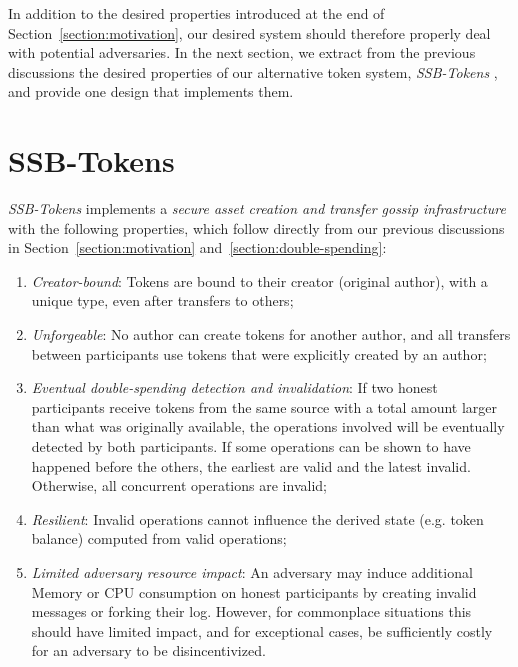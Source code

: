 \documentclass[sigplan,screen,10pt]{acmart}
\newcommand\ssbtokens[0]{\textit{SSB-Tokens} }
\begin{document}
In addition to the desired properties introduced at the end of Section~\ref{section:motivation}, our desired system should therefore properly deal with potential adversaries. In the next section, we extract from the previous discussions the desired properties of our alternative token system, \ssbtokens, and provide one design that implements them.

\section{SSB-Tokens}
\label{section:design}

\ssbtokens implements a \textit{secure asset creation and transfer gossip infrastructure} with the following properties, which follow directly from our previous discussions in Section~\ref{section:motivation} and~\ref{section:double-spending}:
\begin{enumerate}[label*=P.\arabic*]
	\item \textit{Creator-bound}: Tokens are bound to their creator (original author), with a unique type, even after transfers to others;\label{prop:author-bound}
	\item \textit{Unforgeable}: No author can create tokens for another author, and all transfers between participants use tokens that were explicitly created by an author; \label{prop:unforgeable}
	\item \textit{Eventual double-spending detection and invalidation}: If two honest participants receive tokens from the same source with a total amount larger than what was originally available, the operations involved will be eventually detected by both participants. If some operations can be shown to have happened before the others, the earliest are valid and the latest invalid. Otherwise, all concurrent operations are invalid; \label{prop:double-spending-detection}
	\item \textit{Resilient}: Invalid operations cannot influence the derived state (e.g. token balance) computed from valid operations; \label{prop:resilient}
	\item \textit{Limited adversary resource impact}: An adversary may induce additional Memory or CPU consumption on honest participants by creating invalid messages or forking their log. However, for commonplace situations this should have limited impact, and for exceptional cases, be sufficiently costly for an adversary to be disincentivized. \label{prop:bounded-adversary-impact}
\end{enumerate}
\end{document}
